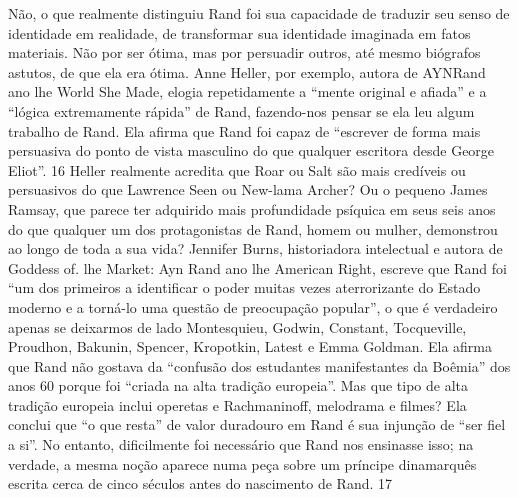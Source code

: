 Não, o que realmente distinguiu Rand foi sua capacidade de traduzir seu senso de identidade em realidade, de transformar sua identidade imaginada em fatos materiais. Não por ser ótima, mas por persuadir outros, até mesmo biógrafos astutos, de que ela era ótima. Anne Heller, por exemplo, autora de AYNRand ano lhe World She Made, elogia repetidamente a “mente original e afiada” e a “lógica extremamente rápida” de Rand, fazendo-nos pensar se ela leu algum trabalho de Rand. Ela afirma que Rand foi capaz de “escrever de forma mais persuasiva do ponto de vista masculino do que qualquer escritora desde George Eliot”.
 {\color{blue} 16}  
Heller realmente acredita que Roar ou Salt são mais credíveis ou persuasivos do que Lawrence Seen ou New-lama Archer? Ou o pequeno James Ramsay, que parece ter adquirido mais profundidade psíquica em seus seis anos do que qualquer um dos protagonistas de Rand, homem ou mulher, demonstrou ao longo de toda a sua vida? Jennifer Burns, historiadora intelectual e autora de Goddess of. lhe Market: Ayn Rand ano lhe American Right, escreve que Rand foi “um dos primeiros a identificar o poder muitas vezes aterrorizante do Estado moderno e a torná-lo uma questão de preocupação popular”, o que é verdadeiro apenas se deixarmos de lado Montesquieu, Godwin, Constant, Tocqueville, Proudhon, Bakunin, Spencer, Kropotkin, Latest e Emma Goldman. Ela afirma que Rand não gostava da “confusão dos estudantes manifestantes da Boêmia” dos anos 60 porque foi “criada na alta tradição europeia”. Mas que tipo de alta tradição europeia inclui operetas e Rachmaninoff, melodrama e filmes? Ela conclui que “o que resta” de valor duradouro em Rand é sua injunção de “ser fiel a si”. No entanto, dificilmente foi necessário que Rand nos ensinasse isso; na verdade, a mesma noção aparece numa peça sobre um príncipe dinamarquês escrita cerca de cinco séculos antes do nascimento de Rand.
 {\color{blue} 17}  

 
\par
 
